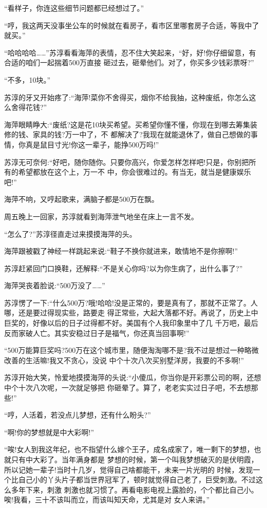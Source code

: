 \documentclass[11pt,a4paper,onecolumn]{article}
\begin{document}
``看样子，你连这些细节问题都已经想过了。''

``哼，我这两天没事坐公车的时候就在看房子，看市区里哪套房子合适，等我中了就买。''

``哈哈哈哈……''苏淳看看海萍的表情，忍不住大笑起来，``好，好!你仔细留意，有合适的咱们一起揣着500万直接
砸过去，砸晕他们。对了，你买多少钱彩票呀?''

``不多，10块。''

苏淳的牙又开始疼了:``海萍!菜你不舍得买，烟你不给我抽，这种废纸，你怎么这么舍得花钱?''

海萍眼睛睁大:``废纸?这是花10块买希望。买希望你懂不懂，你现在到哪去筹集装修的钱、家具的钱?万一中了，不
都解决了?我现在就能退休了，做自己想做的事情，你真是鼠目寸光!你这一辈子，能挣500万吗!''

苏淳无可奈何:``好吧，随你随你。只要你高兴，你爱怎样怎样吧!只是，你别把所有的希望都放在这个上，万一不
中，你会很难过的。有当无，就当是健康娱乐吧!''

海萍不响，又哼起歌来，满脑子都是500万在飘。

周五晚上一回家，苏淳就看到海萍泄气地坐在床上一言不发。

``怎么了?''苏淳径直走过来摸摸海萍的头。

海萍跟被戳了神经一样跳起来说:``鞋子不换你就进来，敢情地不是你擦啊!''

苏淳赶紧回门口换鞋，还解释:``不是关心你吗?以为你生病了，出什么事了?''

海萍哭丧着脸说:``500万没了……''

苏淳愣了一下:``什么500万?哦!哈哈!没是正常的，要是真有了，那就不正常了。人哪，还是要过得现实些，路要走
得正常些，大起大落都不好。再说了，历史上中巨奖的，好像以后的日子过得都不好。美国有个人我印象里中了几
千万吧，最后反而家破人亡。其实安稳过日子是福气，你还真当回事啊!''

``500万能算巨奖吗?500万在这个城市里，随便淘淘哪不是?我不过是想过一种略微改善的生活嘛!我又不贪心，没说
中个十次八次买别墅洋房，我要的不多啊!''

苏淳开始大笑，怜爱地摸摸海萍的头说:``小傻瓜，你当你是开彩票公司的啊，还想中个十次八次呢，一次就足够把
你砸晕了。算了，老老实实过日子吧，不去想那些!''

``哼，人活着，若没点儿梦想，还有什么盼头?''

``啊!你的梦想就是中大彩啊!''

``唉!女人到我这年纪，也不指望什么嫁个王子，成名成家了，唯一剩下的梦想，也就只有中大彩了。当年满身都是
梦想的时候，第一个叫我梦想破灭的是伏明霞，所以记她一辈子!当时十几岁，觉得自己啥都能干，未来一片光明的
时候，发现一个比自己小的丫头片子都当世界冠军了，顿时就觉得自己老了，巨受刺激。不过这么多年下来，刺激
刺激也就习惯了。再看电影电视上露脸的，个个都比自己小。唉!我看，三十不该叫而立，而该叫知天命，尤其是对
女人来讲。''
\end{document}
